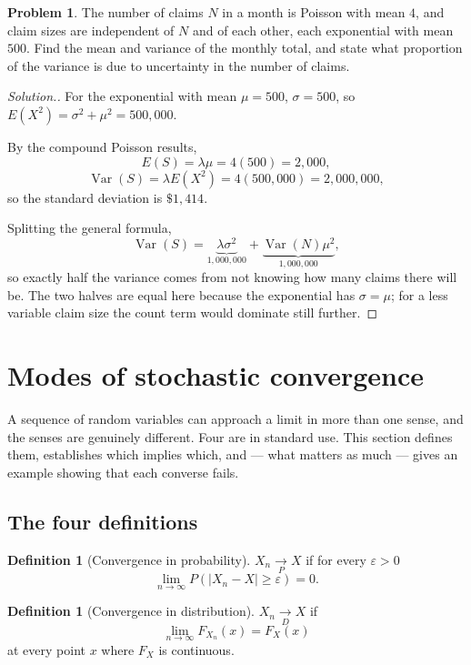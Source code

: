 \documentclass[11pt,a4paper]{article}
\theoremstyle{definition}
\newtheorem{defn}[thm]{Definition}
\newtheorem{problemx}{Problem}[subsection]
\newenvironment{problem}{\begin{problemx}}{\end{problemx}}
\newenvironment{solution}
  {\renewcommand{\qedsymbol}{}\begin{proof}[\textit{Solution}.]}
  {\end{proof}}
\DeclareMathOperator{\Var}{Var}
\begin{document}
\begin{problem}
The number of claims $N$ in a month is Poisson with mean $4$, and claim sizes
are independent of $N$ and of each other, each exponential with mean $500$.
Find the mean and variance of the monthly total, and state what proportion of
the variance is due to uncertainty in the number of claims.
\end{problem}
\begin{solution}
For the exponential with mean $\mu=500$, $\sigma=500$, so
$E\left(X^{2}\right) = \sigma^{2}+\mu^{2} = 500{,}000$.

By the compound Poisson results,
$$E(S) = \lambda\mu = 4(500) = 2{,}000 ,$$
$$\Var(S) = \lambda E\left(X^{2}\right) = 4(500{,}000) = 2{,}000{,}000 ,$$
so the standard deviation is $\$1{,}414$.

Splitting the general formula,
$$\Var(S) = \underbrace{\lambda\sigma^{2}}_{1{,}000{,}000}
+ \underbrace{\Var(N)\mu^{2}}_{1{,}000{,}000},$$
so exactly half the variance comes from not knowing how many claims there will
be. The two halves are equal here because the exponential has
$\sigma=\mu$; for a less variable claim size the count term would dominate
still further.
\end{solution}


\section{Modes of stochastic convergence}

A sequence of random variables can approach a limit in more than one sense, and
the senses are genuinely different. Four are in standard use. This section
defines them, establishes which implies which, and --- what matters as much ---
gives an example showing that each converse fails.

\subsection{The four definitions}

\begin{defn}[Convergence in probability]
$X_n \underset{P}{\longrightarrow} X$ if for every $\varepsilon>0$
$$\lim_{n\rightarrow\infty} P\left(\left|X_n - X\right| \geq \varepsilon\right) = 0 .$$
\end{defn}

\begin{defn}[Convergence in distribution]
$X_n \underset{D}{\longrightarrow} X$ if
$$\lim_{n\rightarrow\infty} F_{X_n}(x) = F_X(x)$$
at every point $x$ where $F_X$ is continuous.
\end{defn}
\end{document}
